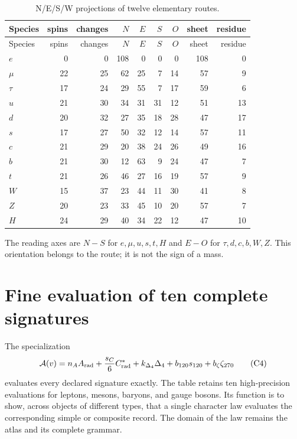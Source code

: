\begin{longtable}{@{}lrrrrrrrr@{}}
\caption{N/E/S/W projections of twelve elementary routes.}
\label{tab:doce-huellas-ruta-rev6}\\
\toprule
Species&spins&changes&\(N\)&\(E\)&\(S\)&\(O\)&sheet&residue\\
\midrule
\endfirsthead
\toprule
Species&spins&changes&\(N\)&\(E\)&\(S\)&\(O\)&sheet&residue\\
\midrule
\endhead
\(e\)&0&0&108&0&0&0&108&0\\
\(\mu\)&22&25&62&25&7&14&57&9\\
\(\tau\)&17&24&29&55&7&17&59&6\\
\(u\)&21&30&34&31&31&12&51&13\\
\(d\)&20&32&27&35&18&28&47&17\\
\(s\)&17&27&50&32&12&14&57&11\\
\(c\)&21&29&20&38&24&26&49&16\\
\(b\)&21&30&12&63&9&24&47&7\\
\(t\)&21&26&46&27&16&19&57&9\\
\(W\)&15&37&23&44&11&30&41&8\\
\(Z\)&20&23&33&45&10&20&57&7\\
\(H\)&24&29&40&34&22&12&47&10\\
\bottomrule
\end{longtable}

The reading axes are \(N\!-\!S\) for
\(e,\mu,u,s,t,H\) and \(E\!-\!O\) for
\(\tau,d,c,b,W,Z\). This orientation belongs to the route; it is not the sign of
a mass.

\section{Fine evaluation of ten complete signatures}

The specialization
\[
\mathcal A(v)=
n_AA_{\rm rad}
+\frac{s_C}{6}C^*_{\rm rad}
+k_{\Delta_4}\Delta_4
+b_{120}s_{120}
+b_{\zeta}\zeta_{270}
\tag{C4}\label{eq:evaluacion-fina-catalogo}
\]
evaluates every declared signature exactly. The table retains ten
high-precision evaluations for leptons, mesons, baryons, and gauge bosons. Its function
is to show, across objects of different types, that a single character
law evaluates the corresponding simple or composite record. The
domain of the law remains the atlas and its complete grammar.

